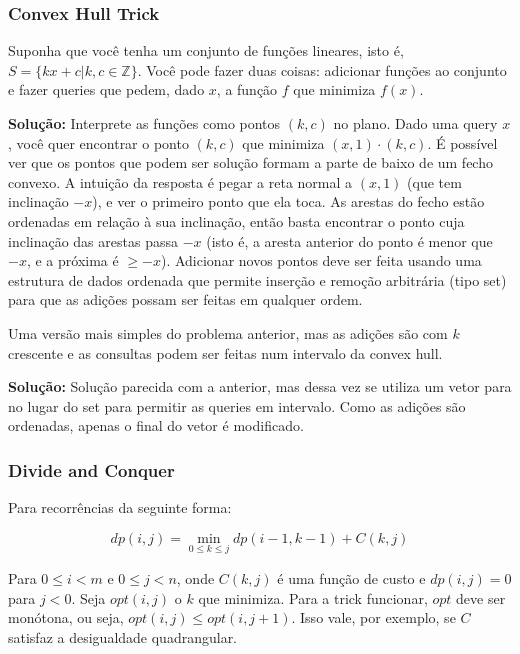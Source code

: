 \subsubsection{Convex Hull Trick}

 Suponha que você tenha um conjunto de funções lineares, isto é, $S = \{kx + c | k, c \in \mathbb{Z}\}$. Você pode fazer duas coisas: adicionar funções ao conjunto e fazer queries que pedem, dado $x$, a função $f$ que minimiza $f(x)$.

\textbf{Solução:} Interprete as funções como pontos $(k, c)$ no plano. Dado uma query $x$, você quer encontrar o ponto $(k, c)$ que minimiza $(x, 1) \cdot (k, c)$. É possível ver que os pontos que podem ser solução formam a parte de baixo de um fecho convexo. A intuição da resposta é pegar a reta normal a $(x, 1)$ (que tem inclinação $-x$), e ver o primeiro ponto que ela toca. As arestas do fecho estão ordenadas em relação à sua inclinação, então basta encontrar o ponto cuja inclinação das arestas passa $-x$ (isto é, a aresta anterior do ponto é menor que $-x$, e a próxima é $\ge -x$). Adicionar novos pontos deve ser feita usando uma estrutura de dados ordenada que permite inserção e remoção arbitrária (tipo set) para que as adições possam ser feitas em qualquer ordem.


 Uma versão mais simples do problema anterior, mas as adições são com $k$ crescente e as consultas podem ser feitas num intervalo da convex hull.

\textbf{Solução:} Solução parecida com a anterior, mas dessa vez se utiliza um vetor para no lugar do set para permitir as queries em intervalo. Como as adições são ordenadas, apenas o final do vetor é modificado.


\subsubsection{Divide and Conquer}

Para recorrências da seguinte forma:

\begin{equation*}
    dp(i, j) = \min_{0 \le k \le j} dp(i-1, k-1) + C(k, j)
\end{equation*}

Para $0 \le i < m$ e $0 \le j < n$, onde $C(k, j)$ é uma função	de custo e $dp(i, j) = 0$ para $j < 0$. Seja $opt(i, j)$ o $k$ que minimiza. Para a trick funcionar, $opt$ deve ser monótona, ou seja, $opt(i, j) \le opt(i, j+1)$. Isso vale, por exemplo, se $C$ satisfaz a desigualdade quadrangular. 

